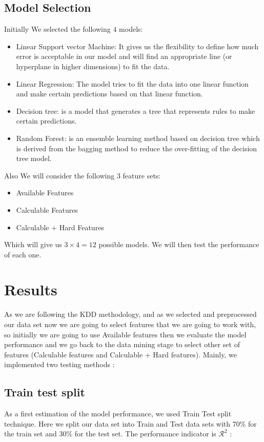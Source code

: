 \subsection{Model Selection}
Initially We selected the following $4$ models: 
\begin{itemize}
\item Linear Support vector Machine:  It gives us the flexibility to define how much error is acceptable in our model and will find an appropriate line (or hyperplane in higher dimensions) to fit the data.
\item Linear Regression: The model tries to fit the data into one linear function and make certain predictions based on that linear function.
\item Decision tree: is a model that generates a tree that represents rules to make certain predictions.
\item Random Forest: is an ensemble learning method based on decision tree which is derived from the bagging method to reduce the over-fitting of the decision tree model. 
\end{itemize}

Also We will consider the following $3$ feature sets:
\begin{itemize}
    \item Available Features
    \item Calculable Features
    \item Calculable + Hard Features 
\end{itemize}

Which will give us $3\times 4=12$ possible models. We will then test the performance of each one.

\section{Results}
As we are following the KDD methodology, and as we selected and preprocessed our data set now we are going to select features that we are going to work with, so initially we are going to use Available features then we evaluate the model performance and we go back to the data mining stage to select other set of features (Calculable features and Calculable + Hard features). Mainly, we implemented two testing methods : 


\subsection{Train test split}
As a first estimation of the model performance, we used Train Test split technique.
Here we split our data set into Train and Test data sets with 70\% for the train set and 30\% for the test set. The performance indicator is $\mathcal{R}^{2}$\cite{10} :

